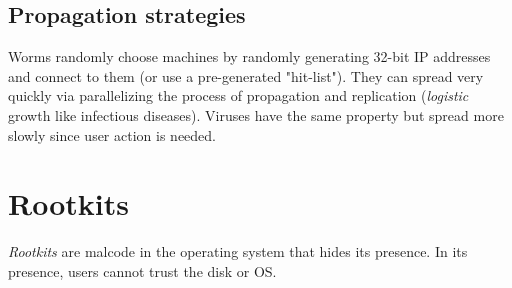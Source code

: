 \subsection{Propagation strategies}
Worms randomly choose machines by randomly generating 32-bit IP addresses and connect to them (or use a pre-generated "hit-list"). They can spread very quickly via parallelizing the process of propagation and replication (\emph{logistic} growth like infectious diseases). Viruses have the same property but spread more slowly since user action is needed.

\section{Rootkits}
\emph{Rootkits} are malcode in the operating system that hides its presence. In its presence, users cannot trust the disk or OS.